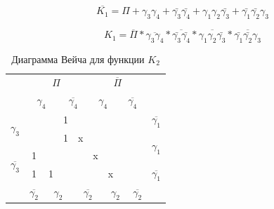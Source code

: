 \documentclass[a4paper,14pt]{article}
\begin{document}
$$\overline{K_1} = \Pi + \gamma_3 \gamma_4 + \bar{\gamma_3} \bar{\gamma_4} + \gamma_1 \gamma_2 \bar{\gamma_3} + \bar{\gamma_1} \bar{\gamma_2} \gamma_3$$



$$K_1 = \overline{\Pi} * \overline{\gamma_3 \gamma_4} * \overline{\bar{\gamma_3} \bar{\gamma_4}} * \overline{\gamma_1 \gamma_2 \bar{\gamma_3}} * \overline{\bar{\gamma_1} \bar{\gamma_2} \gamma_3}$$


\begin{table}[H]	
	\begin{center}
		\caption{\label{tab:dvKorrK2} Диаграмма Вейча для функции $K_2$}
	\begin{tabular}{cccccccccc}
		& \multicolumn{4}{c}{$\Pi$}                                                                             & \multicolumn{4}{c}{$\overline{\Pi}$}                                                                          &                     \\
		& \multicolumn{2}{c}{$\gamma_4$}                          & \multicolumn{2}{c}{$\overline{\gamma_4}$}                         & \multicolumn{2}{c}{$\gamma_4$}                          & \multicolumn{2}{c}{$\overline{\gamma_4}$}                       &                     \\ \cline{2-9}
		\multicolumn{1}{c|}{\multirow{2}{*}{$\gamma_3$}}  & \multicolumn{1}{c|}{}  & \multicolumn{1}{c|}{}  & \multicolumn{1}{c|}{1} & \multicolumn{1}{c|}{}  & \multicolumn{1}{c|}{}  & \multicolumn{1}{c|}{}  & \multicolumn{1}{c|}{} & \multicolumn{1}{c|}{} & $\overline{\gamma_1}$                 \\ \cline{2-9}
		\multicolumn{1}{c|}{}                     & \multicolumn{1}{c|}{}  & \multicolumn{1}{c|}{}  & \multicolumn{1}{c|}{1} & \multicolumn{1}{c|}{x} & \multicolumn{1}{c|}{}  & \multicolumn{1}{c|}{}  & \multicolumn{1}{c|}{} & \multicolumn{1}{c|}{} & \multirow{2}{*}{$\gamma_1$} \\ \cline{2-9}
		\multicolumn{1}{c|}{\multirow{2}{*}{$\overline{\gamma_3}$}} & \multicolumn{1}{c|}{1} & \multicolumn{1}{c|}{}  & \multicolumn{1}{c|}{}  & \multicolumn{1}{c|}{}  & \multicolumn{1}{c|}{x} & \multicolumn{1}{c|}{}  & \multicolumn{1}{c|}{} & \multicolumn{1}{c|}{} &                     \\ \cline{2-9}
		\multicolumn{1}{c|}{}                     & \multicolumn{1}{c|}{1} & \multicolumn{1}{c|}{1} & \multicolumn{1}{c|}{}  & \multicolumn{1}{c|}{}  & \multicolumn{1}{c|}{}  & \multicolumn{1}{c|}{x} & \multicolumn{1}{c|}{} & \multicolumn{1}{c|}{} & $\overline{\gamma_1}$                \\ \cline{2-9}
		& $\overline{\gamma_2}$                    & \multicolumn{2}{c}{$\gamma_2$}                          & \multicolumn{2}{c}{$\overline{\gamma_2}$}                         & \multicolumn{2}{c}{$\gamma_2$}                         & $\overline{\gamma_2}$                   &                    
	\end{tabular}
\end{center}
\end{table}
\end{document}
